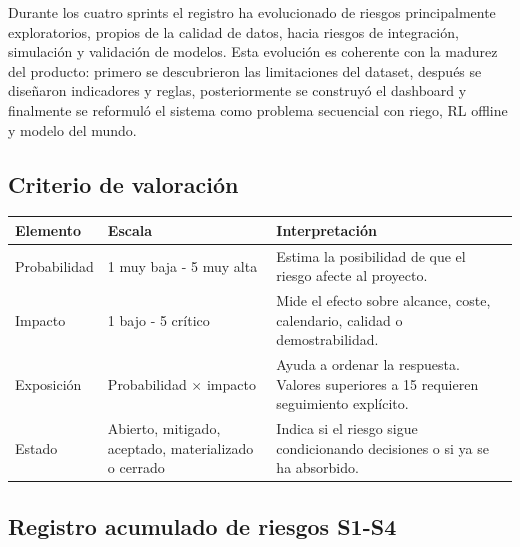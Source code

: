 \documentclass[11pt,a4paper]{article}
\begin{document}
Durante los cuatro sprints el registro ha evolucionado de riesgos principalmente exploratorios, propios de la calidad de datos, hacia riesgos de integración, simulación y validación de modelos. Esta evolución es coherente con la madurez del producto: primero se descubrieron las limitaciones del dataset, después se diseñaron indicadores y reglas, posteriormente se construyó el dashboard y finalmente se reformuló el sistema como problema secuencial con riego, RL offline y modelo del mundo.

\subsection{Criterio de valoración}

\begin{table}[H]
\centering
\begin{tabular}{p{3cm}p{4cm}p{6.5cm}}
\toprule
\textbf{Elemento} & \textbf{Escala} & \textbf{Interpretación} \\
\midrule
Probabilidad & 1 muy baja - 5 muy alta & Estima la posibilidad de que el riesgo afecte al proyecto. \\
Impacto & 1 bajo - 5 crítico & Mide el efecto sobre alcance, coste, calendario, calidad o demostrabilidad. \\
Exposición & Probabilidad $\times$ impacto & Ayuda a ordenar la respuesta. Valores superiores a 15 requieren seguimiento explícito. \\
Estado & Abierto, mitigado, aceptado, materializado o cerrado & Indica si el riesgo sigue condicionando decisiones o si ya se ha absorbido. \\
\bottomrule
\end{tabular}
\end{table}

\subsection{Registro acumulado de riesgos S1-S4}
\end{document}
